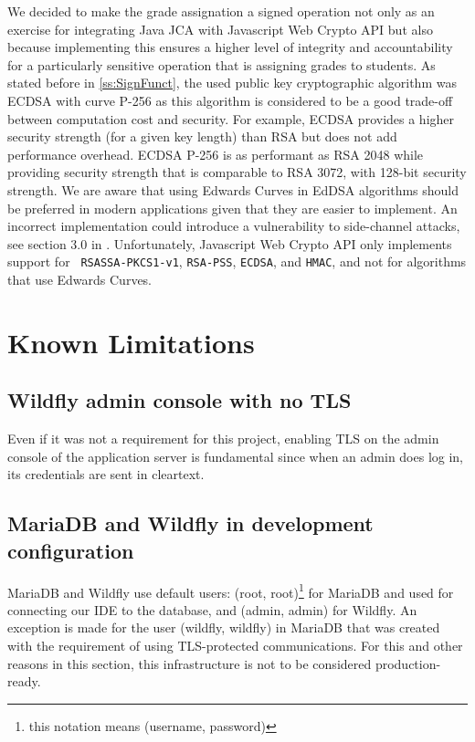 We decided to make the grade assignation a signed operation not only as an exercise for integrating Java JCA with Javascript Web Crypto API but also because implementing this ensures a higher level of integrity and accountability for a particularly sensitive operation that is assigning grades to students. As stated before in \autoref{ss:SignFunct}, the used public key cryptographic algorithm was ECDSA with curve P-256 as this algorithm is considered to be a good trade-off between computation cost and security. For example, ECDSA provides a higher security strength (for a given key length) than RSA but does not add performance overhead. ECDSA P-256 is as performant as RSA 2048 while providing security strength that is comparable to RSA 3072, with 128-bit security strength\cite{online:AWS}. We are aware that using Edwards Curves in EdDSA algorithms should be preferred in modern applications given that they are easier to implement. An incorrect implementation could introduce a vulnerability to side-channel attacks, see section 3.0 in \cite{Adalier2015EfficientAS}. Unfortunately, Javascript Web Crypto API only implements support for \texttt{ RSASSA-PKCS1-v1}, \texttt{RSA-PSS}, \texttt{ECDSA}, and \texttt{HMAC}, and not for algorithms that use Edwards Curves.

\newpage
\chapter{Known Limitations}

\section{Wildfly admin console with no TLS}

Even if it was not a requirement for this project, enabling TLS on the admin console of the application server is fundamental since when an admin does log in, its credentials are sent in cleartext. 

\section{MariaDB and Wildfly in development configuration}

MariaDB and Wildfly use default users: (root, root)\footnote{this notation means (username, password)} for MariaDB and used for connecting our IDE to the database, and (admin, admin) for Wildfly. An exception is made for the user (wildfly, wildfly) in MariaDB that was created with the requirement of using TLS-protected communications. For this and other reasons in this section, this infrastructure is not to be considered production-ready.

